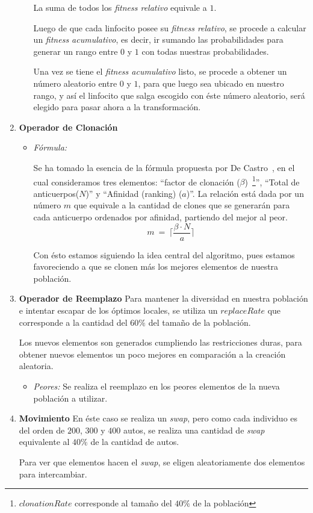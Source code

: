 \begin{enumerate}
\begin{itemize}
				La suma de todos los \emph{fitness relativo} equivale a $1$.
					
				Luego de que cada linfocito posee su \emph{fitness relativo}, se procede a calcular un \emph{fitness acumulativo},
				es decir, ir sumando las probabilidades para generar un rango entre $0$ y $1$ con todas nuestras probabilidades.
					
				Una vez se tiene el \emph{fitness acumulativo} listo, se procede a obtener un número aleatorio entre $0$ y $1$,
				para que luego sea ubicado en nuestro rango, y así el linfocito que salga escogido con éste número aleatorio, será
				elegido para pasar ahora a la transformación.
		
		\end{itemize}
	\item \textbf{Operador de Clonación}
		\begin{itemize}
			\item \emph{Fórmula:}

				Se ha tomado la esencia de la fórmula propuesta por De Castro~\cite{decastro},
				en el cual consideramos tres elementos: ``factor de clonación ($\beta$)~\footnote{$clonationRate$
				corresponde al tamaño del $40\%$ de la población}'', ``Total de anticuerpos($N$)'' y
				``Afinidad (ranking) ($a$)''.
				La relación está dada por un número $m$ que equivale a la cantidad de clones que se generarán
				para cada anticuerpo ordenados por afinidad, partiendo del mejor al peor.
				$$m\ =\ \lceil\frac{\beta \cdot N}{a}\rceil$$

				Con ésto estamos siguiendo la idea central del algoritmo, pues estamos favoreciendo a que se clonen más
				los mejores elementos de nuestra población.
				
		\end{itemize}
	\item \textbf{Operador de Reemplazo}
		Para mantener la diversidad en nuestra población e intentar escapar de los óptimos locales,
		se utiliza un $replaceRate$ que corresponde a la cantidad del $60\%$ del tamaño de la población.

		Los nuevos elementos son generados cumpliendo las restricciones duras, para obtener nuevos
		elementos un poco mejores en comparación a la creación aleatoria.
		\begin{itemize}
			\item \emph{Peores:}
				Se realiza el reemplazo en los peores elementos de la nueva población a utilizar.

		\end{itemize}
	\item \textbf{Movimiento}
		En éste caso se realiza un \emph{swap}, pero como cada individuo es del orden de $200$, $300$ y $400$ autos,
		se realiza una cantidad de \emph{swap} equivalente al $40\%$ de la cantidad de autos.
	
		Para ver que elementos hacen el \emph{swap}, se eligen aleatoriamente dos elementos para intercambiar.
\
\end{enumerate}


